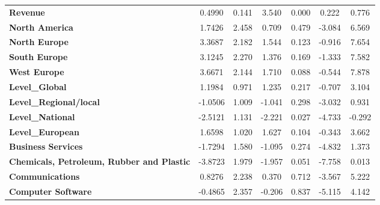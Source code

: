 \documentclass[ 11pt]{article}
\begin{document}
\begin{center}
\begin{longtable}{lcccccc}
\textbf{Revenue}                                           &       0.4990  &        0.141     &     3.540  &         0.000        &        0.222    &        0.776     \\
\textbf{North America}                                     &       1.7426  &        2.458     &     0.709  &         0.479        &       -3.084    &        6.569     \\
\textbf{North Europe}                                      &       3.3687  &        2.182     &     1.544  &         0.123        &       -0.916    &        7.654     \\
\textbf{South Europe}                                      &       3.1245  &        2.270     &     1.376  &         0.169        &       -1.333    &        7.582     \\
\textbf{West Europe}                                       &       3.6671  &        2.144     &     1.710  &         0.088        &       -0.544    &        7.878     \\
\textbf{Level\_Global}                                     &       1.1984  &        0.971     &     1.235  &         0.217        &       -0.707    &        3.104     \\
\textbf{Level\_Regional/local}                             &      -1.0506  &        1.009     &    -1.041  &         0.298        &       -3.032    &        0.931     \\
\textbf{Level\_National}                                   &      -2.5121  &        1.131     &    -2.221  &         0.027        &       -4.733    &       -0.292     \\
\textbf{Level\_European}                                   &       1.6598  &        1.020     &     1.627  &         0.104        &       -0.343    &        3.662     \\
\textbf{Business Services}                                 &      -1.7294  &        1.580     &    -1.095  &         0.274        &       -4.832    &        1.373     \\
\textbf{Chemicals, Petroleum, Rubber and Plastic}          &      -3.8723  &        1.979     &    -1.957  &         0.051        &       -7.758    &        0.013     \\
\textbf{Communications}                                    &       0.8276  &        2.238     &     0.370  &         0.712        &       -3.567    &        5.222     \\
\textbf{Computer Software}                                 &      -0.4865  &        2.357     &    -0.206  &         0.837        &       -5.115    &        4.142     \\

\end{longtable}
\end{center}
\end{document}
